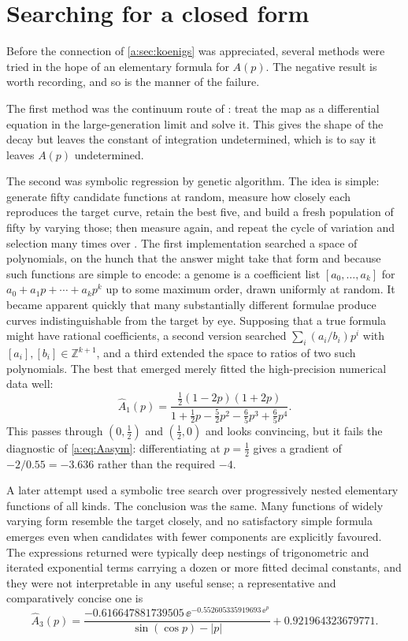 \section{Searching for a closed form}
\label{a:sec:GA}

Before the connection of \cref{a:sec:koenigs} was appreciated, several methods were
tried in the hope of an elementary formula for $A(p)$. The negative result is worth
recording, and so is the manner of the failure.

The first method was the continuum route of \ChM: treat the map as a
differential equation in the large-generation limit and solve it. This gives the
shape of the decay but leaves the constant of integration undetermined, which is to
say it leaves $A(p)$ undetermined.

The second was symbolic regression by genetic algorithm. The idea is simple:
generate fifty candidate functions at random, measure how closely each reproduces
the target curve, retain the best five, and build a fresh population of fifty by
varying those; then measure again, and repeat the cycle of variation and selection
many times over \cite{stanley2002evolving,cohen2024physics}. The first
implementation searched a space of polynomials, on the hunch that the answer might
take that form and because such functions are simple to encode: a genome is a
coefficient list $[a_0,\dots,a_k]$ for $a_0+a_1p+\cdots+a_kp^k$ up to some maximum
order, drawn uniformly at random. It became apparent quickly that many
substantially different formulae produce curves indistinguishable from the target
by eye. Supposing that a true formula might have rational coefficients, a second
version searched $\sum_i(a_i/b_i)p^i$ with $[a_i],[b_i]\in\mathbb Z^{k+1}$, and a
third extended the space to ratios of two such polynomials. The best that emerged
merely fitted the high-precision numerical data well:
\begin{equation}
\label{a:eq:A1hat}
\hat A_1(p) = \frac{\tfrac12(1-2p)(1+2p)}
{1+\tfrac12p-\tfrac52p^2-\tfrac65p^3+\tfrac65p^4} .
\end{equation}
This passes through $(0,\tfrac12)$ and $(\tfrac12,0)$ and looks convincing, but it
fails the diagnostic of \cref{a:eq:Aasym}: differentiating at $p=\tfrac12$ gives a
gradient of $-2/0.55 = -3.636$ rather than the required $-4$.

A later attempt used a symbolic tree search over progressively nested elementary
functions of all kinds. The conclusion was the same. Many functions of widely
varying form resemble the target closely, and no satisfactory simple formula
emerges even when candidates with fewer components are explicitly favoured. The
expressions returned were typically deep nestings of trigonometric and iterated
exponential terms carrying a dozen or more fitted decimal constants, and they were
not interpretable in any useful sense; a representative and comparatively concise
one is
\begin{equation}
\label{a:eq:A3hat}
\hat A_3(p) = \frac{-0.616647881739505\,\ee^{-0.552605335919693\,\ee^{p}}}
{\sin(\cos p)-|p|} + 0.921964323679771 .
\end{equation}

